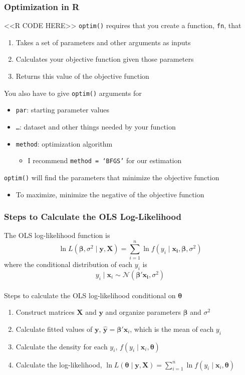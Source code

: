 \documentclass{beamer}
\begin{document}
\begin{frame}[fragile]\frametitle{Optimization in R}
    <<R CODE HERE>>
    \vspace{1ex}
    \texttt{optim()} requires that you create a function, \texttt{fn}, that
    \begin{enumerate}
        \item Takes a set of parameters and other arguments as inputs
        \item Calculates your objective function given those parameters
        \item Returns this value of the objective function
    \end{enumerate}
    \vspace{1ex}
    You also have to give \texttt{optim()} arguments for
    \begin{itemize}
        \item \texttt{par}: starting parameter values
        \item \texttt{\ldots}: dataset and other things needed by your function
        \item \texttt{method}: optimization algorithm
        \begin{itemize}
            \item I recommend \texttt{method = `BFGS'} for our estimation
        \end{itemize}
    \end{itemize}
    \vspace{1ex}
    \texttt{optim()} will find the parameters that minimize the objective function
    \begin{itemize}
        \item To maximize, minimize the negative of the objective function
    \end{itemize}
\end{frame}

\begin{frame}\frametitle{Steps to Calculate the OLS Log-Likelihood}
    The OLS log-likelihood function is
    $$\ln L(\bm{\beta}, \sigma^2 \mid \bm{y}, \bm{X}) = \sum_{i = 1}^n \ln f(y_i \mid \bm{x_i}, \bm{\beta}, \sigma^2)$$
    where the conditional distribution of each $y_i$ is
    $$y_i \mid \bm{x}_i \sim \mathcal{N}(\bm{\beta}' \bm{x_i}, \sigma^2)$$ \\
    \vspace{2ex}
    Steps to calculate the OLS log-likelihood conditional on $\bm{\theta}$
    \begin{enumerate}
        \item Construct matrices $\bm{X}$ and $\bm{y}$ and organize parameters $\bm{\beta}$ and $\sigma^2$
        \item Calculate fitted values of $\bm{y}$, $\widehat{\bm{y}} = \bm{\beta}' \bm{x}_i$, which is the mean of each $y_i$
        \item Calculate the density for each $y_i$, $f(y_i \mid \bm{x}_i, \bm{\theta})$
        \item Calculate the log-likelihood, $\ln L(\bm{\theta} \mid \bm{y}, \bm{X}) = \sum_{i = 1}^n \ln f(y_i \mid \bm{x}_i, \bm{\theta})$
    \end{enumerate}
\end{frame}
\end{document}
